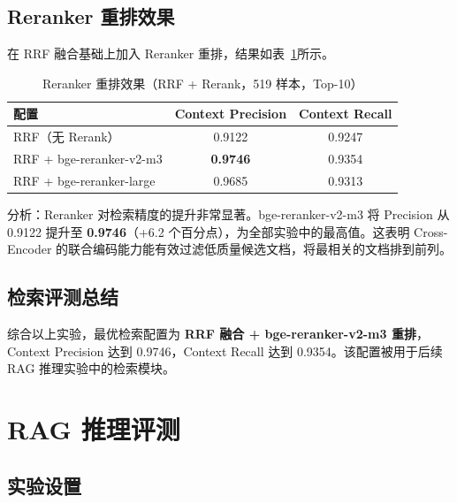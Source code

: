 \documentclass[12pt, a4paper]{article}
\begin{document}
\subsection{Reranker 重排效果}

在 RRF 融合基础上加入 Reranker 重排，结果如表~\ref{tab:reranker_compare}所示。

\begin{table}[H]
\centering
\caption{Reranker 重排效果（RRF + Rerank，519 样本，Top-10）}
\label{tab:reranker_compare}
\begin{tabular}{lcc}
\toprule
\textbf{配置} & \textbf{Context Precision} & \textbf{Context Recall} \\
\midrule
RRF（无 Rerank）                  & 0.9122 & 0.9247 \\
RRF + bge-reranker-v2-m3          & \textbf{0.9746} & 0.9354 \\
RRF + bge-reranker-large          & 0.9685 & 0.9313 \\
\bottomrule
\end{tabular}
\end{table}

分析：Reranker 对检索精度的提升非常显著。bge-reranker-v2-m3 将 Precision 从 0.9122 提升至 \textbf{0.9746}（+6.2 个百分点），为全部实验中的最高值。这表明 Cross-Encoder 的联合编码能力能有效过滤低质量候选文档，将最相关的文档排到前列。

\subsection{检索评测总结}

综合以上实验，最优检索配置为 \textbf{RRF 融合 + bge-reranker-v2-m3 重排}，Context Precision 达到 0.9746，Context Recall 达到 0.9354。该配置被用于后续 RAG 推理实验中的检索模块。

\section{RAG 推理评测}

\subsection{实验设置}
\end{document}
